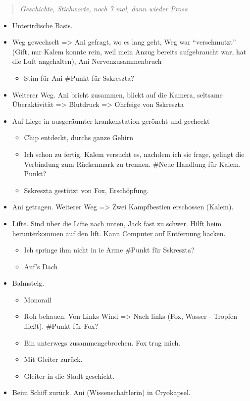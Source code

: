 \documentclass[11pt]{article}
\begin{document}
\begin{quote}
\emph{Geschichte, Stichworte, noch 7 mal, dann wieder Prosa}

\end{quote}
\begin{itemize}
\item
  Unterirdische Basis.
\item
  Weg gewechselt =\textgreater{} Ani gefragt, wo es lang geht, Weg war
  ``verschmutzt'' (Gift, nur Kalem konnte rein, weil mein Anzug bereits
  aufgebraucht war, hat die Luft angehalten), Ani Nervenzusammenbruch
  \begin{itemize}
  \item
    Stim für Ani \#Punkt für Sskreszta?
  \end{itemize}
\item
  Weiterer Weg. Ani bricht zusammen, blickt auf die Kamera, seltsame
  Überaktivität =\textgreater{} Blutdruck =\textgreater{} Ohrfeige von
  Sskreszta
\item
  Auf Liege in ausgeräumter krankenstation geröncht und gecheckt

  \begin{itemize}
  \item
    Chip entdeckt, durchs ganze Gehirn
  \item
    Ich schon zu fertig. Kalem versucht es, nachdem ich sie frage,
    gelingt die Verbindung zum Rückenmark zu trennen. \#Neue Handlung
    für Kalem. Punkt?
  \item
    Sskreszta gestützt von Fox, Erschöpfung.
  \end{itemize}
\item
  Ani getragen. Weiterer Weg =\textgreater{} Zwei Kampfbestien
  erschossen (Kalem).
\item
  Lifte. Sind über die Lifte nach unten, Jack fast zu schwer. Hilft beim
  herunterkommen auf den lift. Kann Computer auf Entfernung hacken.

  \begin{itemize}
  \item
    Ich springe ihm nicht in ie Arme \#Punkt für Sskreszta?
  \item
    Auf's Dach
  \end{itemize}
\item
  Bahnsteig.

  \begin{itemize}
  \item
    Monorail
  \item
    Roh behauen. Von Links Wind =\textgreater{} Nach links (Fox, Wasser
    - Tropfen fließt). \#Punkt für Fox?
  \item
    Bin unterwegs zusammengebrochen. Fox trug mich.
  \item
    Mit Gleiter zurück.
  \item
    Gleiter in die Stadt geschickt.
  \end{itemize}
\item
  Beim Schiff zurück. Ani (Wissenschaftlerin) in Cryokapsel.


\end{itemize}
\end{document}
